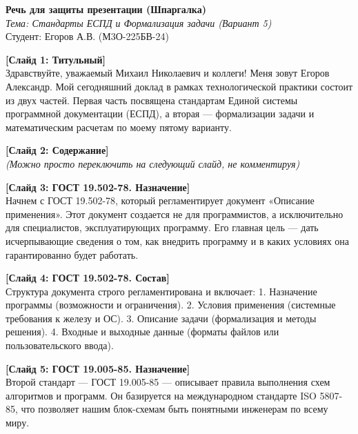 \documentclass[14pt,a4paper]{extarticle}
\begin{document}
\begin{center}
    \Large \textbf{Речь для защиты презентации (Шпаргалка)} \\
    \vspace{0.3cm}
    \large \textit{Тема: Стандарты ЕСПД и Формализация задачи (Вариант 5)} \\
    \vspace{0.3cm}
    \normalsize Студент: Егоров А.В. (М3О-225БВ-24)
\end{center}
\vspace{1cm}

\textbf{[Слайд 1: Титульный]} \\
Здравствуйте, уважаемый Михаил Николаевич и коллеги! Меня зовут Егоров Александр. Мой сегодняшний доклад в рамках технологической практики состоит из двух частей. Первая часть посвящена стандартам Единой системы программной документации (ЕСПД), а вторая — формализации задачи и математическим расчетам по моему пятому варианту.

\vspace{0.5cm}
\textbf{[Слайд 2: Содержание]} \\
\textit{(Можно просто переключить на следующий слайд, не комментируя)}

\vspace{0.5cm}
\textbf{[Слайд 3: ГОСТ 19.502-78. Назначение]} \\
Начнем с ГОСТ 19.502-78, который регламентирует документ «Описание применения». Этот документ создается не для программистов, а исключительно для специалистов, эксплуатирующих программу. Его главная цель — дать исчерпывающие сведения о том, как внедрить программу и в каких условиях она гарантированно будет работать.

\vspace{0.5cm}
\textbf{[Слайд 4: ГОСТ 19.502-78. Состав]} \\
Структура документа строго регламентирована и включает:
1. Назначение программы (возможности и ограничения).
2. Условия применения (системные требования к железу и ОС).
3. Описание задачи (формализация и методы решения).
4. Входные и выходные данные (форматы файлов или пользовательского ввода).

\vspace{0.5cm}
\textbf{[Слайд 5: ГОСТ 19.005-85. Назначение]} \\
Второй стандарт — ГОСТ 19.005-85 — описывает правила выполнения схем алгоритмов и программ. Он базируется на международном стандарте ISO 5807-85, что позволяет нашим блок-схемам быть понятными инженерам по всему миру.
\end{document}
